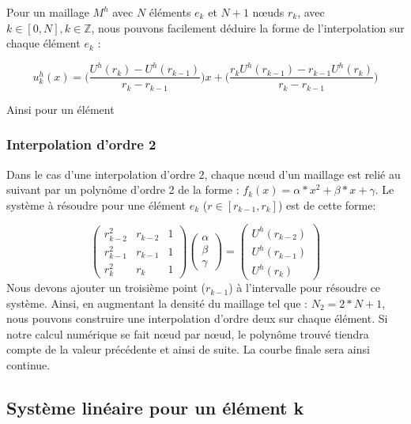 \documentclass[a4paper,10pt]{report} %
\begin{document}
Pour un maillage $M^h$ avec $N$ éléments $e_{k}$ et $N+1$ nœuds $r_{k}$, avec $k\in [0,N],k\in\mathbb{Z}$, nous pouvons facilement déduire la forme de l'interpolation sur chaque élément $e_{k}$ :

\begin{equation}
	u^h_{k}(x)=\Big(\frac{U^h(r_{k})-U^h(r_{k-1})}{r_{k}-r_{k-1}}\Big)x+(\frac{r_{k}U^h(r_{k-1})-r_{k-1}U^h(r_{k})}{r_{k}-r_{k-1}}\Big)
	\label{interpolationP1}
\end{equation}

Ainsi pour un élément 

\subsubsection{Interpolation d'ordre 2}

Dans le cas d'une interpolation d'ordre 2, chaque nœud d'un maillage est relié au suivant par un polynôme d'ordre 2 de la forme : $f_{k}(x)=\alpha*x^2+\beta*x+\gamma$. Le système à résoudre pour une élément $e_k$ ($r\in[r_{k-1},r_{k}]$) est de cette forme:

\begin{equation}
\begin{pmatrix}
r_{k-2}^2 & r_{k-2} & 1 \\
r_{k-1}^2 & r_{k-1} & 1 \\
r_{k}^2 & r_{k} & 1 
\end{pmatrix}
\begin{pmatrix}
\alpha \\
\beta \\
\gamma
\end{pmatrix}
=
\begin{pmatrix}
U^h(r_{k-2}) \\
U^h(r_{k-1}) \\
U^h(r_{k})
\end{pmatrix}
\end{equation}
Nous devons ajouter un troisième point ($r_{k-1}$) à l'intervalle pour résoudre ce système. Ainsi, en augmentant la densité du maillage tel que : $N_2=2*N+1$, nous pouvons construire une interpolation d'ordre deux sur chaque élément. Si notre calcul numérique se fait nœud par nœud, le polynôme trouvé tiendra compte de la valeur précédente et ainsi de suite. La courbe finale sera ainsi continue.

\subsection{Système linéaire pour un élément k}
\end{document}
